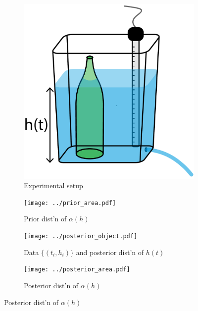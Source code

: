 \documentclass[openacc]{rsproca_new}%
\begin{document}
\begin{figure}[h!]
    \centering
        \begin{subfigure}[b]{0.3\textwidth}
    	\includegraphics[width=\textwidth]{../tank_geometry/tank_w_bottle.pdf}
	\caption{Experimental setup} \label{fig:tank_w_bottle}
    \end{subfigure}
     \begin{subfigure}[b]{0.49\textwidth}
    	\texttt{[image: ../prior\_area.pdf]}
	\caption{Prior dist'n of $\alpha(h)$} \label{fig:prior_area}
    \end{subfigure}
    
     \begin{subfigure}[b]{0.49\textwidth}
    	\texttt{[image: ../posterior\_object.pdf]}
	\caption{Data $\{(t_i, h_i)\}$ and posterior dist'n of $h(t)$} \label{fig:posterior_object}
    \end{subfigure}
    \begin{subfigure}[b]{0.49\textwidth}
    	\texttt{[image: ../posterior\_area.pdf]}
	\caption{Posterior dist'n of $\alpha(h)$} \label{fig:posterior_area}
    \end{subfigure}


\end{figure}
\end{document}
